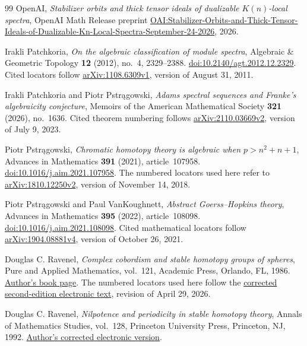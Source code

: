 \begin{thebibliography}{99}
OpenAI,
\emph{Stabilizer orbits and thick tensor ideals of dualizable $K(n)$-local spectra},
OpenAI Math Release preprint
\href{https://github.com/openai/math/blob/main/preprints/Stabilizer-Orbits-and-Thick-Tensor-Ideals-of-Dualizable-Kn-Local-Spectra-September-24-2026/paper.pdf}{OAI:Stabilizer-Orbits-and-Thick-Tensor-Ideals-of-Dualizable-Kn-Local-Spectra-September-24-2026},
2026.

Irakli Patchkoria,
\emph{On the algebraic classification of module spectra},
Algebraic \& Geometric Topology \textbf{12} (2012),
no.~4, 2329--2388.
\href{https://doi.org/10.2140/agt.2012.12.2329}{doi:10.2140/agt.2012.12.2329}.
Cited locators follow
\href{https://arxiv.org/pdf/1108.6309v1}{arXiv:1108.6309v1},
version of August 31, 2011.

Irakli Patchkoria and Piotr Pstr\k{a}gowski,
\emph{Adams spectral sequences and Franke's algebraicity conjecture},
Memoirs of the American Mathematical Society \textbf{321} (2026),
no.~1636.
Cited theorem numbering follows
\href{https://arxiv.org/abs/2110.03669v2}{arXiv:2110.03669v2},
version of July 9, 2023.

Piotr Pstr\k{a}gowski,
\emph{Chromatic homotopy theory is algebraic when $p>n^2+n+1$},
Advances in Mathematics \textbf{391} (2021), article~107958.
\href{https://doi.org/10.1016/j.aim.2021.107958}{doi:10.1016/j.aim.2021.107958}.
The numbered locators used here refer to
\href{https://arxiv.org/abs/1810.12250v2}{arXiv:1810.12250v2},
version of November 14, 2018.

Piotr Pstr\k{a}gowski and Paul VanKoughnett,
\emph{Abstract Goerss--Hopkins theory},
Advances in Mathematics \textbf{395} (2022), article~108098.
\href{https://doi.org/10.1016/j.aim.2021.108098}{doi:10.1016/j.aim.2021.108098}.
Cited mathematical locators follow
\href{https://arxiv.org/abs/1904.08881v4}{arXiv:1904.08881v4},
version of October 26, 2021.

Douglas C. Ravenel,
\emph{Complex cobordism and stable homotopy groups of spheres},
Pure and Applied Mathematics, vol.~121, Academic Press, Orlando, FL, 1986.
\href{https://www.sas.rochester.edu/mth/sites/doug-ravenel/mu.html}{Author's book page}.
The numbered locators used here follow the
\href{https://www.sas.rochester.edu/mth/sites/doug-ravenel/mybooks/ravenel.pdf}{corrected second-edition electronic text},
revision of April 29, 2026.

Douglas C. Ravenel,
\emph{Nilpotence and periodicity in stable homotopy theory},
Annals of Mathematics Studies, vol.~128, Princeton University Press,
Princeton, NJ, 1992.
\href{https://www.sas.rochester.edu/mth/sites/doug-ravenel/mybooks/nilpb2020.pdf}{Author's corrected electronic version}.


\end{thebibliography}
